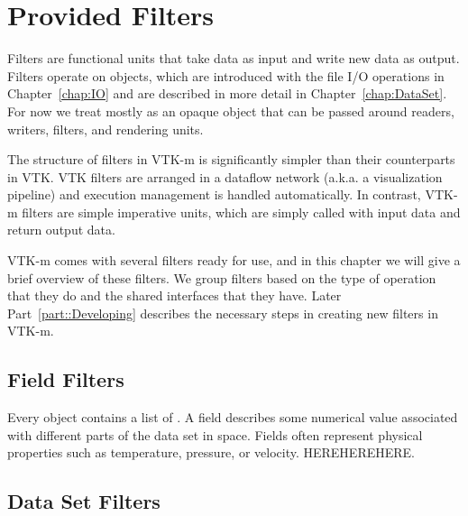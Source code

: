 
\chapter{Provided Filters}
\label{chap:ProvidedFilters}


Filters are functional units that take data as input and write new data as
output. Filters operate on  objects, which are introduced
with the file I/O operations in Chapter~\ref{chap:IO} and are described in
more detail in Chapter~\ref{chap:DataSet}. For now we treat
 mostly as an opaque object that can be passed
around readers, writers, filters, and rendering units.

\begin{didyouknow}
  The structure of filters in VTK-m is significantly simpler than their
  counterparts in VTK. VTK filters are arranged in a dataflow network
  (a.k.a. a visualization pipeline) and execution management is handled
  automatically. In contrast, VTK-m filters are simple imperative units,
  which are simply called with input data and return output data.
\end{didyouknow}

VTK-m comes with several filters ready for use, and in this chapter we will
give a brief overview of these filters. We group filters based on the type
of operation that they do and the shared interfaces that they have. Later
Part~\ref{part::Developing} describes the necessary steps in creating new
filters in VTK-m.


\section{Field Filters}


Every  object contains a list of 
. A field describes some numerical value associated with
different parts of the data set in space. Fields often represent physical
properties such as temperature, pressure, or velocity. HEREHEREHERE.



\section{Data Set Filters}



